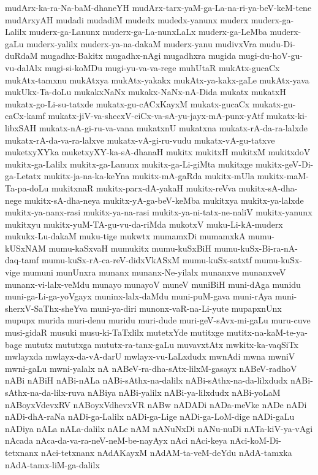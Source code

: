 {mudArx-ka-ra-Na-baM-dhaneYH
mudArx-tarx-yaM-ga-La-na-ri-ya-beV-keM-tene
mudArxyAH
mudadi
mudadiM
mudedx
mudedx-yanunx
muderx
muderx-ga-Lalilx
muderx-ga-Lanunx
muderx-ga-La-nunxLaLx
muderx-ga-LeMba
muderx-gaLu
muderx-yalilx
muderx-ya-na-dakaM
muderx-yanu
mudivxVra
mudu-Di-duRdaM
mugadhx-Bakitx
mugadhx-nAgi
mugadhxra
mugida
mugi-du-hoV-gu-vu-dalAlx
mugi-si-koMDu
mugi-yu-va-va-rege
muhUtaR
mukAtx-gucaCx
mukAtx-tamxnu
mukAtxya
mukAtx-yakakx
mukAtx-ya-kakx-gaLe
mukAtx-yava
mukUkx-Ta-doLu
mukakxNaNx
mukakx-NaNx-nA-Dida
mukatx
mukatxH
mukatx-go-Li-su-tatxde
mukatx-gu-cACxKayxM
mukatx-gucaCx
mukatx-gu-caCx-kamf
mukatx-jiV-va-shecxV-ciCx-va-sA-yu-jayx-mA-punx-yAtf
mukatx-ki-libxSAH
mukatx-nA-gi-ru-va-vana
mukatxnU
mukatxna
mukatx-rA-da-ra-lalxde
mukatx-rA-da-va-ra-lalxve
mukatx-vA-gi-ru-vudu
mukatx-vA-gu-tatxve
muketxyXYka
muketxyXY-ka-sA-dhanaH
mukitx
mukitxH
mukitxM
mukitxdoV
mukitx-ga-Lalilx
mukitx-ga-Lanunx
mukitx-ga-Li-giMta
mukitxge
mukitx-geV-Di-ga-Letatx
mukitx-ja-na-ka-keYna
mukitx-mA-gaRda
mukitx-mUla
mukitx-maM-Ta-pa-doLu
mukitxnaR
mukitx-parx-dA-yakaH
mukitx-reVva
mukitx-sA-dha-nege
mukitx-sA-dha-neya
mukitx-yA-ga-beV-keMba
mukitxya
mukitx-ya-lalxde
mukitx-ya-nanx-rasi
mukitx-ya-na-rasi
mukitx-ya-ni-tatx-ne-naliV
mukitx-yanunx
mukitxyu
mukitx-yuM-TA-gu-vu-da-riMda
mukotxV
muku-Li-kA-muderx
mukukx-Lu-dakaM
muku-tige
mukwtx
mumamxDi
mumamxkA
mumu-kUSxNAM
mumu-kaSxvaH
mumukitx
mumu-kuSxBiH
mumu-kuSx-Bi-ra-nA-daq-tamf
mumu-kuSx-rA-ca-reV-didxVkASxM
mumu-kuSx-satxtf
mumu-kuSx-vige
mumuni
munUnxra
munanx
munanx-Ne-yilalx
munanxve
munanxveV
munanx-vi-lalx-veMdu
munayo
munayoV
muneV
muniBiH
muni-dAga
munidu
muni-ga-Li-ga-yoVgayx
muninx-lalx-daMdu
muni-puM-gava
muni-rAya
muni-sherxV-SaThx-sheYva
muni-ya-diri
munonx-vaR-na-Li-yute
mupapxnUnx
mupupx
murida
muri-denu
muridu
muri-dude
muri-geV-sAvx-mi-gaLu
muru-cuve
musi-gidaR
musuki
musu-ki-TaTxlilx
mutetxYde
mutitxge
mutitx-na-kaM-te-ya-bage
mututx
mututxga
mututx-ra-tanx-gaLu
muvavxtAtx
mwkitx-ka-vaqSiTx
mwlayxda
mwlayx-da-vA-darU
mwlayx-vu-LaLxdudx
mwnAdi
mwna
mwniV
mwni-gaLu
mwni-yalalx
nA
nABeV-ra-dha-sAtx-lilxM-gasayx
nABeV-radhoV
nABi
nABiH
nABi-nALa
nABi-sAthx-na-dalilx
nABi-sAthx-na-da-lilxdudx
nABi-sAthx-na-da-lilx-ruva
nABiya
nABi-yalilx
nABi-ya-lilxdudx
nABi-yoLaM
nABoyxVdevxRV
nABoyxVdhevxVR
nABw
nADADi
nADa-meVke
nADe
nADi
nADi-dhA-raNa
nADi-ga-Lalilx
nADi-ga-Lige
nADi-ga-LoM-dige
nADi-gaLu
nADiya
nALa
nALa-dalilx
nALe
nAM
nANuNxDi
nANu-nuDi
nATa-kiV-ya-vAgi
nAcada
nAca-da-va-ra-neV-neM-be-nayAyx
nAci
nAci-keya
nAci-koM-Di-tetxnanx
nAci-tetxnanx
nAdAKayxM
nAdAM-ta-veM-deYdu
nAdA-tamxka
nAdA-tamx-liM-ga-dalilx
}
